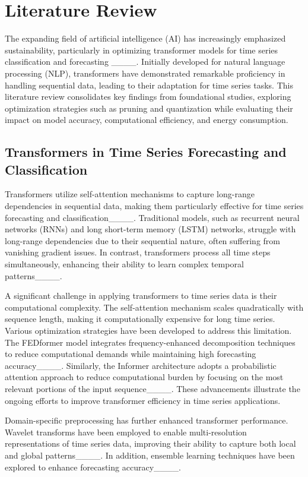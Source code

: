 \section{Literature Review}
The expanding field of artificial intelligence (AI) has increasingly emphasized sustainability, particularly in optimizing transformer models for time series classification and forecasting ____. Initially developed for natural language processing (NLP), transformers have demonstrated remarkable proficiency in handling sequential data, leading to their adaptation for time series tasks. This literature review consolidates key findings from foundational studies, exploring optimization strategies such as pruning and quantization while evaluating their impact on model accuracy, computational efficiency, and energy consumption.

\subsection{Transformers in Time Series Forecasting and Classification}

Transformers utilize self-attention mechanisms to capture long-range dependencies in sequential data, making them particularly effective for time series forecasting and classification____. Traditional models, such as recurrent neural networks (RNNs) and long short-term memory (LSTM) networks, struggle with long-range dependencies due to their sequential nature, often suffering from vanishing gradient issues. In contrast, transformers process all time steps simultaneously, enhancing their ability to learn complex temporal patterns____.

A significant challenge in applying transformers to time series data is their computational complexity. The self-attention mechanism scales quadratically with sequence length, making it computationally expensive for long time series. Various optimization strategies have been developed to address this limitation. The FEDformer model integrates frequency-enhanced decomposition techniques to reduce computational demands while maintaining high forecasting accuracy____. Similarly, the Informer architecture adopts a probabilistic attention approach to reduce computational burden by focusing on the most relevant portions of the input sequence____. These advancements illustrate the ongoing efforts to improve transformer efficiency in time series applications.

Domain-specific preprocessing has further enhanced transformer performance. Wavelet transforms have been employed to enable multi-resolution representations of time series data, improving their ability to capture both local and global patterns____. In addition, ensemble learning techniques have been explored to enhance forecasting accuracy____.

